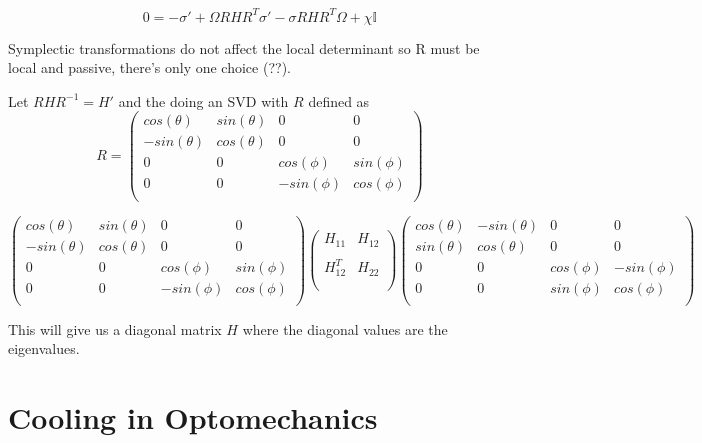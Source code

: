 \documentclass[11pt,a4paper]{article}
\numberwithin{equation}{section}
\begin{document}
	\begin{equation*} 
	0 = -\sigma' + \Omega R H R^T \sigma' - \sigma RH R^T\Omega + \chi \mathbb{I}
	\end{equation*}
	
	Symplectic transformations do not affect the local determinant so R must be local and passive, there's only one choice (??).
	
	Let $RHR^{-1} = H'$ and the doing an SVD with $R$ defined as
	\begin{equation*}
	R = \begin{pmatrix}
	cos(\theta) & sin(\theta) & 0 & 0\\
	-sin(\theta) & cos(\theta) & 0 & 0\\
	0 & 0 & cos(\phi) & sin(\phi) \\
	0 & 0 & -sin(\phi) & cos(\phi)\\
	\end{pmatrix}
	\end{equation*}

	\begin{equation*}
	\begin{pmatrix}
	cos(\theta) & sin(\theta) & 0 & 0\\
	-sin(\theta) & cos(\theta) & 0 & 0\\
	0 & 0 & cos(\phi) & sin(\phi) \\
	0 & 0 & -sin(\phi) & cos(\phi)\\
	\end{pmatrix}	\begin{pmatrix}
	H_{11} & H_{12}\\
	\\
	H^{T}_{12} & H_{22} \\
	\\
	\end{pmatrix}	\begin{pmatrix}
	cos(\theta) & -sin(\theta) & 0 & 0\\
	sin(\theta) & cos(\theta) & 0 & 0\\
	0 & 0 & cos(\phi) & -sin(\phi) \\
	0 & 0 & sin(\phi) & cos(\phi)\\
	\end{pmatrix}
	\end{equation*}	
	
	This will give us a diagonal matrix $H$ where the diagonal values are the eigenvalues. 
	\fi
	
	\section{Cooling in Optomechanics}
\end{document}
